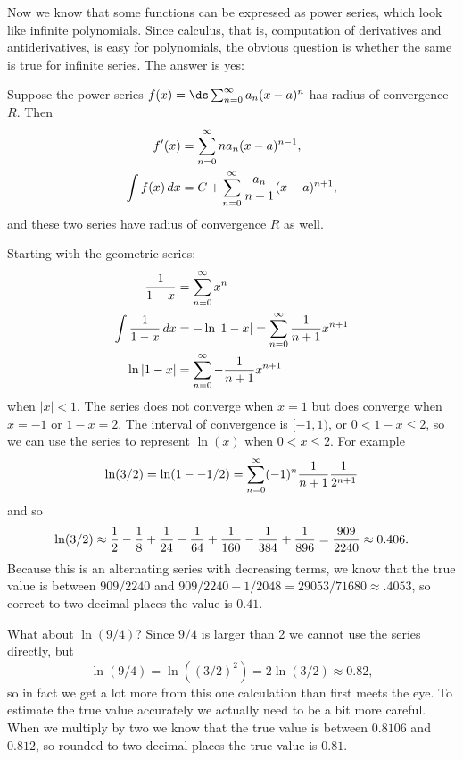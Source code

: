 
\nobreak
Now we know that some functions can be expressed as power series,
which look like infinite polynomials. Since calculus, that is,
computation of derivatives and antiderivatives, is easy for
polynomials, the obvious question is whether the same is true
for infinite series. The answer is yes:

\begin{theorem} Suppose the power series $f(x)=\ds\sum_{n=0}^\infty a_n(x-a)^n$ has
radius of convergence $R$. Then
\begin{align*}
  f'(x)&=\sum_{n=0}^\infty na_n(x-a)^{n-1}, \\
  \int f(x)\,dx &= C+\sum_{n=0}^\infty {a_n\over n+1}(x-a)^{n+1}, \\
\end{align*}
and these two series have radius of convergence $R$ as well.
\end{theorem}

\begin{example}
Starting with the geometric series:
\begin{align*}
  {1\over 1-x} &= \sum_{n=0}^\infty x^n \\
  \int{1\over 1-x}\,dx &= -\ln|1-x| = \sum_{n=0}^\infty {1\over
    n+1}x^{n+1} \\
  \ln|1-x| &= \sum_{n=0}^\infty -{1\over n+1}x^{n+1} \\
\end{align*}
when $|x|<1$. The series does not converge when $x=1$ but does
converge when $x=-1$ or $1-x=2$. The interval of convergence is
$[-1,1)$, or $0<1-x\le2$, so
we can use the series to represent $\ln(x)$
when $0<x\le2$. For example
$$
  \ln(3/2)=\ln(1--1/2)=
  \sum_{n=0}^\infty (-1)^n{1\over n+1}{1\over 2^{n+1}}
$$
and so
$$
  \ln(3/2)\approx {1\over 2}-{1\over 8}+{1\over 24}-{1\over 64}
  +{1\over 160}-{1\over 384}+{1\over 896}
  ={909\over 2240}\approx 0.406
.$$
Because this is an alternating series with decreasing terms,
we know that the true value is between $909/2240$ and
$909/2240-1/2048=29053/71680\approx .4053$, so correct to two decimal
places the value is $0.41$. 

What about $\ln(9/4)$? Since $9/4$ is larger than 2 we cannot use the
series directly, but
$$\ln(9/4)=\ln((3/2)^2)=2\ln(3/2)\approx 0.82,$$
so in fact we get a lot more from this one calculation than first
meets the eye. To estimate the true value accurately we actually need
to be a bit more careful.
When we multiply by two we know that the true value is between
$0.8106$ and $0.812$, so rounded to two decimal places the true value
is $0.81$.
\end{example}


